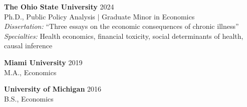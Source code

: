 \textbf{The Ohio State University} \hfill 2024 \\
Ph.D., Public Policy Analysis $|$ Graduate Minor in Economics \\
\textit{Dissertation:} ``Three essays on the economic consequences of chronic illness'' \\
\textit{Specialties:} Health economics, financial toxicity, social determinants of health, causal inference

\bigskip
\textbf{Miami University} \hfill 2019 \\
M.A., Economics

\bigskip
\textbf{University of Michigan} \hfill 2016 \\
B.S., Economics